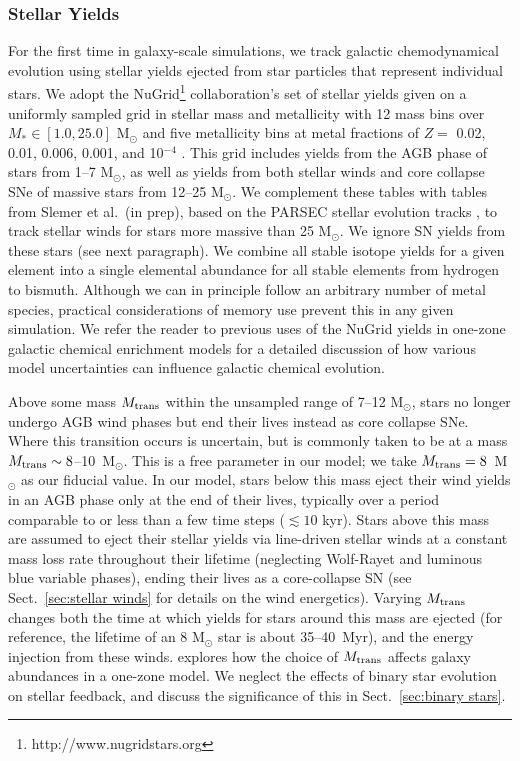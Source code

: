 \documentclass[fleqn,usenatbib,useAMS]{mnras}
\begin{document}
\subsubsection{Stellar Yields}
\label{sec:yields}
For the first time in galaxy-scale simulations, we track galactic chemodynamical evolution using stellar yields ejected from star particles that represent individual stars. We adopt the NuGrid\footnote{http://www.nugridstars.org} collaboration's set of stellar yields given on a uniformly sampled grid in stellar mass and metallicity with 12 mass bins over $M_{*} \in \left[1.0, 25.0\right]$ M$_{\odot}$ and five metallicity bins at metal fractions of $Z =$ 0.02, 0.01, 0.006, 0.001, and 10$^{-4}$ \citep{Pignatari2016, Ritter2017}. This grid includes yields from the AGB phase of stars from 1--7 M$_{\odot}$, as well as yields from both stellar winds and core collapse SNe of massive stars from 12--25 M$_{\odot}$. We complement these tables with tables from Slemer et al.\ (in prep), based on the PARSEC stellar evolution tracks \citep{Bressan2012, Tang2014}, to track stellar winds for stars more massive than 25 M$_{\odot}$. We ignore SN yields from these stars (see next paragraph). We combine all stable isotope yields for a given element into a single elemental abundance for all stable elements from hydrogen to bismuth. Although we can in principle follow an arbitrary number of metal species, practical considerations of memory use prevent this in any given simulation. We refer the reader to previous uses of the NuGrid yields in one-zone galactic chemical enrichment models \citep{Cote2016,  Cote2016_feb,Cote2017a} for a detailed discussion of how various model uncertainties can influence galactic chemical evolution.

%
%

Above some mass $M_{\rm trans}$ within the unsampled range of 7--12 M$_{\odot}$, stars no longer undergo AGB wind phases but end their lives instead as core collapse SNe. Where this transition occurs is uncertain, but is commonly taken to be at a mass $M_{\rm trans} \sim 8$--10~M$_{\odot}$. This is a free parameter in our model; we take $M_{\rm trans} = 8$~M$_{\odot}$ as our fiducial value. In our model, stars below this mass eject their wind yields in an AGB phase only at the end of their lives, typically over a period comparable to or less than a few time steps ($\lesssim 10$ kyr). Stars above this mass are assumed to eject their stellar yields via line-driven stellar winds at a constant mass loss rate throughout their lifetime (neglecting Wolf-Rayet and luminous blue variable phases), ending their lives as a core-collapse SN (see Sect.~\ref{sec:stellar winds} for details on the wind energetics). Varying $M_{\rm trans}$ changes both the time at which yields for stars around this mass are ejected (for reference, the lifetime of an 8 M$_{\odot}$ star is about 35--40~Myr), and the energy injection from these winds. \citet{Cote2017a} explores how the choice of $M_{\rm trans}$ affects galaxy abundances in a one-zone model. We neglect the effects of binary star evolution on stellar feedback, and discuss the significance of this in Sect.~\ref{sec:binary stars}.
\end{document}
